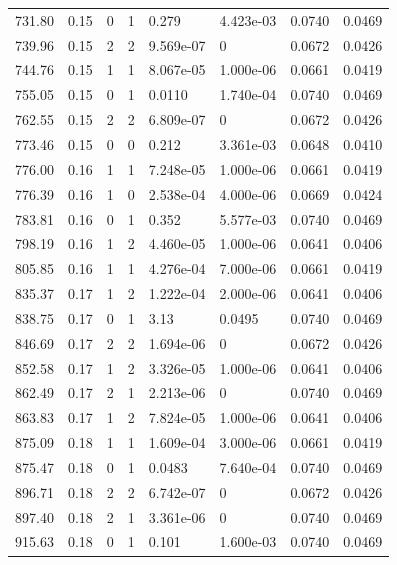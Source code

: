 \documentclass[preview]{standalone}
\begin{document}
{{{\begin{tabular}{L{1.2cm}C{1.2cm} C{0.3cm}C{0.5cm} C{1.4cm}C{1.4cm} C{1.4cm}C{1.4cm}}
  731.80  &  0.15  & 0     &  1 &  0.279  & 4.423e-03  & 0.0740 &  0.0469   \\ 
  739.96  &  0.15  & 2     &  2 &  9.569e-07  & 0  & 0.0672 &  0.0426   \\ 
  744.76  &  0.15  & 1     &  1 &  8.067e-05  & 1.000e-06  & 0.0661 &  0.0419   \\ 
  755.05  &  0.15  & 0     &  1 &  0.0110  & 1.740e-04  & 0.0740 &  0.0469   \\ 
  762.55  &  0.15  & 2     &  2 &  6.809e-07  & 0  & 0.0672 &  0.0426   \\ 
  773.46  &  0.15  & 0     &  0 &  0.212  & 3.361e-03  & 0.0648 &  0.0410   \\ 
  776.00  &  0.16  & 1     &  1 &  7.248e-05  & 1.000e-06  & 0.0661 &  0.0419   \\ 
  776.39  &  0.16  & 1     &  0 &  2.538e-04  & 4.000e-06  & 0.0669 &  0.0424   \\ 
  783.81  &  0.16  & 0     &  1 &  0.352  & 5.577e-03  & 0.0740 &  0.0469   \\ 
  798.19  &  0.16  & 1     &  2 &  4.460e-05  & 1.000e-06  & 0.0641 &  0.0406   \\ 
  805.85  &  0.16  & 1     &  1 &  4.276e-04  & 7.000e-06  & 0.0661 &  0.0419   \\ 
  835.37  &  0.17  & 1     &  2 &  1.222e-04  & 2.000e-06  & 0.0641 &  0.0406   \\ 
  838.75  &  0.17  & 0     &  1 &  3.13  & 0.0495  & 0.0740 &  0.0469   \\ 
  846.69  &  0.17  & 2     &  2 &  1.694e-06  & 0  & 0.0672 &  0.0426   \\ 
  852.58  &  0.17  & 1     &  2 &  3.326e-05  & 1.000e-06  & 0.0641 &  0.0406   \\ 
  862.49  &  0.17  & 2     &  1 &  2.213e-06  & 0  & 0.0740 &  0.0469   \\ 
  863.83  &  0.17  & 1     &  2 &  7.824e-05  & 1.000e-06  & 0.0641 &  0.0406   \\ 
  875.09  &  0.18  & 1     &  1 &  1.609e-04  & 3.000e-06  & 0.0661 &  0.0419   \\ 
  875.47  &  0.18  & 0     &  1 &  0.0483  & 7.640e-04  & 0.0740 &  0.0469   \\ 
  896.71  &  0.18  & 2     &  2 &  6.742e-07  & 0  & 0.0672 &  0.0426   \\ 
  897.40  &  0.18  & 2     &  1 &  3.361e-06  & 0  & 0.0740 &  0.0469   \\ 
  915.63  &  0.18  & 0     &  1 &  0.101  & 1.600e-03  & 0.0740 &  0.0469   \\ 

\end{tabular}}}}
\end{document}

